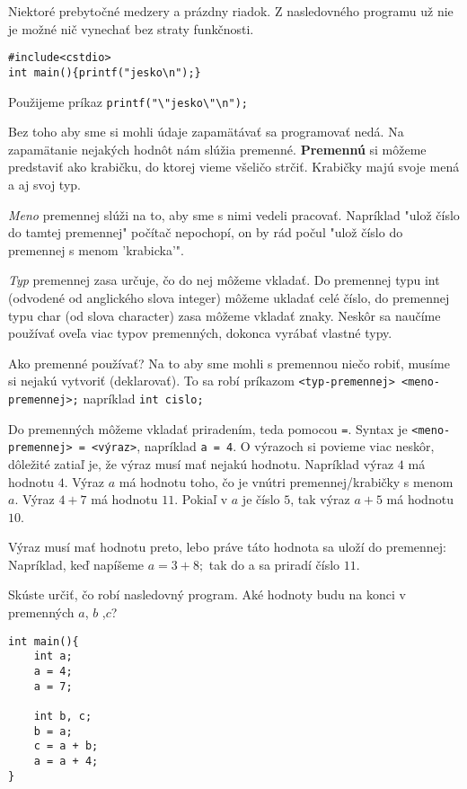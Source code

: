  Niektoré prebytočné medzery a prázdny riadok. Z nasledovného programu už nie je možné nič vynechať bez straty funkčnosti.
\begin{lstlisting}
#include<cstdio>
int main(){printf("jesko\n");}
\end{lstlisting}

 Použijeme príkaz \verb!printf("\"jesko\"\n");!


Bez toho aby sme si mohli údaje zapamätávať sa programovať nedá. Na zapamätanie nejakých hodnôt nám slúžia premenné. \textbf{Premennú} 
si môžeme predstaviť ako krabičku, do ktorej vieme všeličo strčiť. Krabičky majú svoje mená a aj svoj typ. 

\emph{Meno} premennej slúži na to, aby sme s nimi vedeli pracovať. Napríklad "ulož číslo do tamtej premennej" počítač nepochopí, on by rád počul
"ulož číslo do premennej s menom 'krabicka'". 

\emph{Typ} premennej zasa určuje, čo do nej môžeme vkladať. Do premennej typu int (odvodené od anglického slova integer) môžeme ukladať celé číslo,
do premennej typu char (od slova character) zasa môžeme vkladať znaky. Neskôr sa naučíme používať oveľa viac typov premenných, dokonca vyrábať vlastné typy.

\medskip

Ako premenné používať? Na to aby sme mohli s premennou niečo robiť, musíme si nejakú vytvoriť (deklarovať). To sa robí príkazom
\verb!<typ-premennej> <meno-premennej>;! napríklad \verb!int cislo;! 

Do premenných môžeme vkladať priradením, teda pomocou \verb'='. Syntax je 
\verb!<meno-premennej> = <výraz>!, napríklad \verb!a = 4!. O výrazoch si povieme viac neskôr, dôležité zatiaľ je, že výraz musí mať nejakú hodnotu.
Napríklad výraz $4$ má hodnotu $4$. Výraz $a$ má hodnotu toho, čo je vnútri premennej/krabičky s menom $a$.
Výraz $4 + 7$ má hodnotu $11$. Pokiaľ v $a$ je číslo $5$, tak výraz $a + 5$ má hodnotu $10$.

Výraz musí mať hodnotu preto, lebo práve táto hodnota sa uloží do premennej: 
Napríklad, keď napíšeme $a = 3 + 8;$ tak do a sa priradí číslo $11$.

 Skúste určiť, čo robí nasledovný program. Aké hodnoty budu na konci v premenných $a$, $b$ ,$c$?
\begin{lstlisting}
int main(){
    int a;
    a = 4;
    a = 7;

    int b, c;
    b = a;
    c = a + b;
    a = a + 4;
}
\end{lstlisting}

